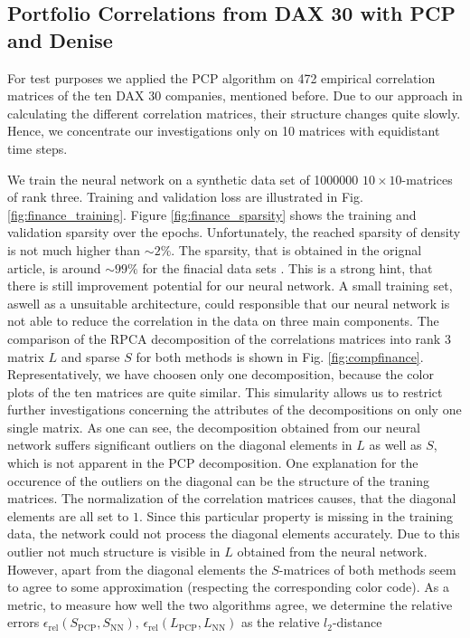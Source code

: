 \subsection{Portfolio Correlations from DAX 30 with PCP and Denise}
For test purposes we applied the PCP algorithm on 472 empirical correlation matrices of the ten DAX 30 companies, mentioned before. Due to our approach in calculating the different correlation matrices, their structure changes quite slowly. Hence, we concentrate our investigations only on 10 matrices with equidistant time steps.
\par
We train the neural network on a synthetic data set of 1000000 $10\times 10$-matrices of rank three. Training and validation loss are illustrated in Fig. \ref{fig:finance_training}. Figure \ref{fig:finance_sparsity} shows the training and validation sparsity over the epochs. Unfortunately, the reached sparsity of density is not much higher than $\sim 2\%$. The sparsity, that is obtained in the orignal article, is around $\sim 99 \%$ for the finacial data sets \cite[Table 2.]{herrera2020denise}. This is a strong hint, that there is still improvement potential for our neural network. A small training set, aswell as a unsuitable architecture, could responsible that our neural network is not able to reduce the correlation in the data on three main components. The comparison of the RPCA decomposition of the correlations matrices into rank $3$ matrix $L$ and sparse $S$ for both methods is shown in Fig. \ref{fig:compfinance}. Representatively, we have choosen only one decomposition, because the color plots of the ten matrices are quite similar. This simularity allows us to restrict further investigations  concerning the attributes of the decompositions on only one single matrix. As one can see, the decomposition obtained from our neural network suffers significant outliers on the diagonal elements in $L$ as well as $S$, which is not apparent in the PCP decomposition. One explanation for the occurence of the outliers on the diagonal can be the structure of the traning matrices. The normalization of the correlation matrices causes, that the diagonal elements are all set to $1$. Since this particular property is missing in the training data, the network could not process the diagonal elements accurately. Due to this outlier not much structure is visible in $L$ obtained from the neural network. However, apart from the diagonal elements the $S$-matrices of both methods seem to agree to some approximation (respecting the corresponding color code). As a metric, to measure how well the two algorithms agree, we determine the relative errors $\epsilon_\text{rel} (S_\text{PCP}, S_\text{NN}),\, \epsilon_\text{rel} (L_\text{PCP}, L_\text{NN})$ as the relative $l_2$-distance
